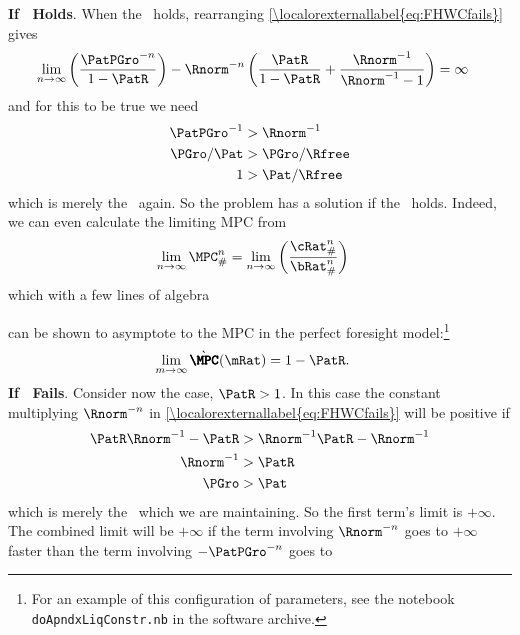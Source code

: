 \documentclass[../BufferStockTheory.tex]{subfiles}
\begin{document}
{\bf If \RIC~Holds}.  When the \RIC~holds, rearranging \eqref{\localorexternallabel{eq:FHWCfails}} gives
\begin{eqnarray*}
  \lim_{n \rightarrow \infty} \left(\frac{\PatPGro^{-n}}{1-\PatR}\right)-\Rnorm^{-n}\left(\frac{\PatR}{1-\PatR}+\frac{\Rnorm^{-1}}{\Rnorm^{-1}-1}\right)  & = \infty
\end{eqnarray*}
and for this to be true we need
\begin{eqnarray*}
  \PatPGro^{-1}  & > \Rnorm^{-1}
\\ \PGro/\Pat  & > \PGro/\Rfree
\\ 1  & > \Pat/\Rfree
\end{eqnarray*}
which is merely the \RIC~again.  So the problem has a solution if the \RIC~holds.  Indeed,
we can even calculate the limiting MPC from
\begin{align}
  \lim_{n \rightarrow \infty} \MPC^{n}_{\#}  & = \lim_{n \rightarrow \infty} \left(\frac{\cRat_{\#}^{n}}{\bRat_{\#}^{n}}\right)
\end{align}
which with a few lines of algebra
\begin{comment}
Calculate the limit of
\begin{align}
\left(\frac{\PatPGro^{-n}}{\PatPGro^{-n}/(1-\PatR) - (1-\Rnorm^{-1}\Rnorm^{-n})/(1-\Rnorm^{-1})}\right)  & = \left(\frac{1}{1/(1-\PatR) + \Rnorm^{-n}\Rnorm^{-1}/(1-\Rnorm^{-1})}\right)
\end{align}
\end{comment}
can be shown to asymptote to the MPC in the perfect foresight model:\footnote{For an example of this configuration of parameters, see the notebook \texttt{doApndxLiqConstr.nb} in the software archive.}
\begin{align}
  \lim_{m \rightarrow \infty} \grave{\pmb{\MPC}}(\mRat)  & = 1-\PatR.
\end{align}
{\bf If \RIC~Fails}.  Consider now the \cncl{\RIC} case, $\PatR > 1$.  In this case the constant multiplying
$\Rnorm^{-n}$ in \eqref{\localorexternallabel{eq:FHWCfails}} will be positive if
\begin{eqnarray*}
  \PatR \Rnorm^{-1} - \PatR  & >  \Rnorm^{-1}\PatR-\Rnorm^{-1}
\\ \Rnorm^{-1}  & > \PatR
\\ \PGro  & > \Pat
\end{eqnarray*}
which is merely the \PFGIC~which we are maintaining.  So the first term's limit is $+\infty$.  The
combined limit will be $+\infty$ if the term involving $\Rnorm^{-n}$
goes to $+\infty$ faster than the term involving $-\PatPGro^{-n}$ goes to
\end{document}
